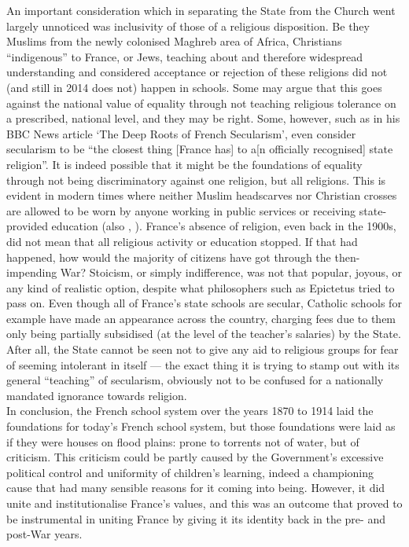 \documentclass[12pt]{article}
\begin{document}
An important consideration which in separating the State from the
Church went largely unnoticed was inclusivity of those of a religious
disposition. Be they Muslims from the newly colonised Maghreb area of
Africa, Christians ``indigenous'' to France, or Jews, teaching about
and therefore widespread understanding and considered acceptance or
rejection of these religions did not (and still in 2014 does not)
happen in schools.  Some may argue that this goes against the national
value of equality through not teaching religious tolerance on a
prescribed, national level, and they may be right. Some, however, such
as \citeauthor{secularism-french-religion} in his BBC News article
`The Deep Roots of French Secularism', even consider secularism to be
``the closest thing [France has] to a[n officially recognised] state
religion''. It is indeed possible that it might be the foundations of
equality through not being discriminatory against one religion, but
all religions. This is evident in modern times where neither Muslim
headscarves nor Christian crosses are allowed to be worn by anyone
working in public services or receiving state-provided education (also
\citeauthor{secularism-french-religion},
\citeyear{secularism-french-religion}). France's absence of religion,
even back in the 1900s, did not mean that all religious activity or
education stopped. If that had happened, how would the majority of
citizens have got through the then-impending War? Stoicism, or simply
indifference, was not that popular, joyous, or any kind of realistic
option, despite what philosophers such as Epictetus tried to pass on.
Even though all of France's state schools are secular, Catholic
schools for example have made an appearance across the country,
charging fees due to them only being partially subsidised (at the
level of the teacher's salaries) by the State. After all, the State
cannot be seen not to give any aid to religious groups for fear of
seeming intolerant in itself --- the exact thing it is trying to stamp
out with its general ``teaching'' of secularism, obviously not to be
confused for a nationally mandated ignorance towards religion.\\

In conclusion, the French school system over the years 1870 to 1914
laid the foundations for today's French school system, but those
foundations were laid as if they were houses on flood plains: prone to
torrents not of water, but of criticism. This criticism could be
partly caused by the Government's excessive political control and
uniformity of children's learning, indeed a championing cause that had
many sensible reasons for it coming into being. However, it did unite
and institutionalise France's values, and this was an outcome that
proved to be instrumental in uniting France by giving it its identity
back in the pre- and post-War years.



\end{document}
